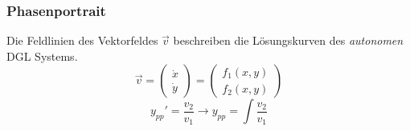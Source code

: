     \subsubsection{Phasenportrait}
        Die Feldlinien des Vektorfeldes $\vec{v}$ beschreiben die Lösungskurven des \textit{autonomen} DGL Systems.
        $$
            \vec{v} =
            \begin{pmatrix}
                \dot{x}\\ \dot{y}
            \end{pmatrix}
            =
            \begin{pmatrix}
                f_1(x,y)\\f_2(x,y)
            \end{pmatrix}
        $$
        \vspace{0.5em}
        $$
            y_{pp}' = \frac{v_2}{v_1} \rightarrow y_{pp} = \int \frac{v_2}{v_1}
        $$  